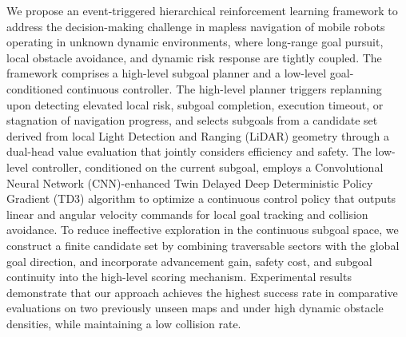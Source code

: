 
We propose an event-triggered hierarchical reinforcement learning framework to address the decision-making challenge in mapless navigation of mobile robots operating in unknown dynamic environments, where long-range goal pursuit, local obstacle avoidance, and dynamic risk response are tightly coupled. The framework comprises a high-level subgoal planner and a low-level goal-conditioned continuous controller. The high-level planner triggers replanning upon detecting elevated local risk, subgoal completion, execution timeout, or stagnation of navigation progress, and selects subgoals from a candidate set derived from local Light Detection and Ranging (LiDAR) geometry through a dual-head value evaluation that jointly considers efficiency and safety. The low-level controller, conditioned on the current subgoal, employs a Convolutional Neural Network (CNN)-enhanced Twin Delayed Deep Deterministic Policy Gradient (TD3) algorithm to optimize a continuous control policy that outputs linear and angular velocity commands for local goal tracking and collision avoidance. To reduce ineffective exploration in the continuous subgoal space, we construct a finite candidate set by combining traversable sectors with the global goal direction, and incorporate advancement gain, safety cost, and subgoal continuity into the high-level scoring mechanism. Experimental results demonstrate that our approach achieves the highest success rate in comparative evaluations on two previously unseen maps and under high dynamic obstacle densities, while maintaining a low collision rate.


